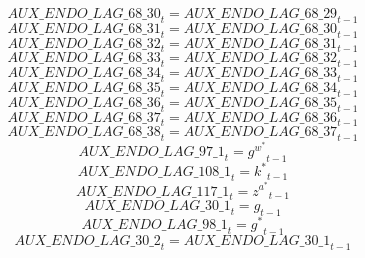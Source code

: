 \begin{dmath}
{AUX\_ENDO\_LAG\_68\_30}_{t}={AUX\_ENDO\_LAG\_68\_29}_{t-1}
\end{dmath}
\begin{dmath}
{AUX\_ENDO\_LAG\_68\_31}_{t}={AUX\_ENDO\_LAG\_68\_30}_{t-1}
\end{dmath}
\begin{dmath}
{AUX\_ENDO\_LAG\_68\_32}_{t}={AUX\_ENDO\_LAG\_68\_31}_{t-1}
\end{dmath}
\begin{dmath}
{AUX\_ENDO\_LAG\_68\_33}_{t}={AUX\_ENDO\_LAG\_68\_32}_{t-1}
\end{dmath}
\begin{dmath}
{AUX\_ENDO\_LAG\_68\_34}_{t}={AUX\_ENDO\_LAG\_68\_33}_{t-1}
\end{dmath}
\begin{dmath}
{AUX\_ENDO\_LAG\_68\_35}_{t}={AUX\_ENDO\_LAG\_68\_34}_{t-1}
\end{dmath}
\begin{dmath}
{AUX\_ENDO\_LAG\_68\_36}_{t}={AUX\_ENDO\_LAG\_68\_35}_{t-1}
\end{dmath}
\begin{dmath}
{AUX\_ENDO\_LAG\_68\_37}_{t}={AUX\_ENDO\_LAG\_68\_36}_{t-1}
\end{dmath}
\begin{dmath}
{AUX\_ENDO\_LAG\_68\_38}_{t}={AUX\_ENDO\_LAG\_68\_37}_{t-1}
\end{dmath}
\begin{dmath}
{AUX\_ENDO\_LAG\_97\_1}_{t}={{g^w^*}}_{t-1}
\end{dmath}
\begin{dmath}
{AUX\_ENDO\_LAG\_108\_1}_{t}={{k^*}}_{t-1}
\end{dmath}
\begin{dmath}
{AUX\_ENDO\_LAG\_117\_1}_{t}={{z^a^*}}_{t-1}
\end{dmath}
\begin{dmath}
{AUX\_ENDO\_LAG\_30\_1}_{t}={{g}}_{t-1}
\end{dmath}
\begin{dmath}
{AUX\_ENDO\_LAG\_98\_1}_{t}={{g^*}}_{t-1}
\end{dmath}
\begin{dmath}
{AUX\_ENDO\_LAG\_30\_2}_{t}={AUX\_ENDO\_LAG\_30\_1}_{t-1}
\end{dmath}
